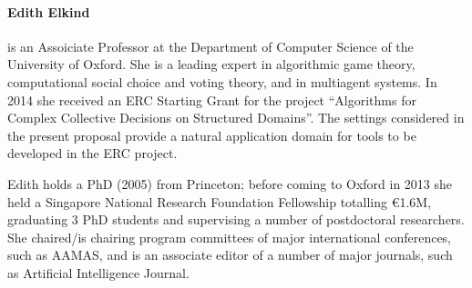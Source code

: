 \paragraph{Edith Elkind}

%

%
is an Assoiciate Professor at the Department of Computer Science of 
the University of Oxford. She is a leading
expert in algorithmic game theory, computational social choice and voting
theory, and in multiagent systems. In 2014 she received an ERC Starting
Grant for the project ``Algorithms for Complex Collective Decisions on
Structured Domains''. The settings considered in the present proposal 
provide a natural application domain for tools to be
developed in the ERC project. 

Edith holds a PhD (2005) from Princeton; before coming to Oxford in 2013
she held a Singapore National Research Foundation Fellowship totalling \euro 1.6M,
graduating 3 PhD students and supervising a number of postdoctoral 
researchers. She chaired/is chairing program committees of
major international conferences, such as AAMAS, 
and is an associate editor of a number of major journals, such as 
Artificial Intelligence Journal.

